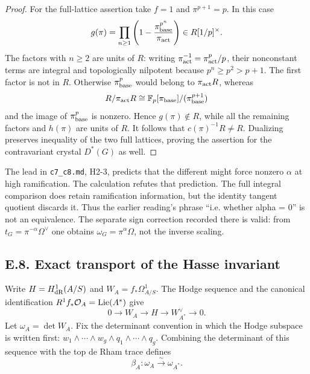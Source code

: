 \begin{proof}
For the full-lattice assertion take $f=1$ and $\pi^{p+1}=p$.  In this case
\[
 g(\pi)=\prod_{n\geq1}
       \left(1-\frac{\pi_{\rm base}^{p^n}}{\pi_{\rm act}}\right)
        \in R[1/p]^\times.
\]
The factors with $n\geq2$ are units of $R$: writing
$\pi_{\rm act}^{-1}=\pi_{\rm act}^{p}/p$, their nonconstant terms are integral and topologically nilpotent because $p^n\geq p^2>p+1$.  The first factor is not in $R$.  Otherwise $\pi_{\rm base}^{p}$ would belong to $\pi_{\rm act}R$, whereas
\[
 R/\pi_{\rm act}R\cong\mathbb F_p[\pi_{\rm base}]/(\pi_{\rm base}^{p+1})
\]
and the image of $\pi_{\rm base}^{p}$ is nonzero.  Hence $g(\pi)\notin R$, while all the remaining factors and $h(\pi)$ are units of $R$.  It follows that $c(\pi)^{-1}R\ne R$.  Dualizing preserves inequality of the two full lattices, proving the assertion for the contravariant crystal $D^*(G)$ as well.
\end{proof}

The lead in \texttt{c7\_c8.md}, H2-3, predicts that the different might force nonzero $\alpha$ at high ramification.  The calculation refutes that prediction.  The full integral comparison does retain ramification information, but the identity tangent quotient discards it.  Thus the earlier reading's phrase ``i.e. whether alpha = 0'' is not an equivalence.  The separate sign correction recorded there is valid: from $t_G=\pi^{-\alpha}\Omega^\vee$ one obtains $\omega_G=\pi^\alpha\Omega$, not the inverse scaling.

\subsection{E.8. Exact transport of the Hasse invariant}

Write $H=H^1_{\mathrm{dR}}(A/S)$ and $W_A=f_*\Omega^1_{A/S}$.  The Hodge sequence and the canonical identification $R^1f_*\mathcal O_A=\operatorname{Lie}(A^*)$ give
\[
 0\longrightarrow W_A\longrightarrow H\longrightarrow W_{A^*}^{\vee}
 \longrightarrow0.
\]
Let $\omega_A=\det W_A$.  Fix the determinant convention in which the Hodge subspace is written first: $w_1\wedge\cdots\wedge w_g\wedge q_1\wedge\cdots\wedge q_g$.  Combining the determinant of this sequence with the top de Rham trace defines
\[
 \beta_A:\omega_A\xrightarrow{\sim}\omega_{A^*}.
\]

